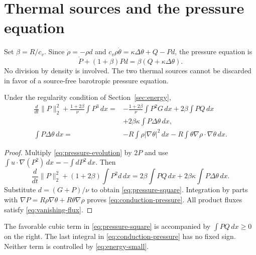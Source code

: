 \documentclass[10pt,twoside]{article}
\newcommand{\dd}{\,dx}
\newcommand{\norm}[2]{\lVert#1\rVert_{#2}}
\begin{document}
\section{Thermal sources and the pressure equation}\label{sec:thermal}
Set $\beta=R/c_v$. Since $\dot\rho=-\rho d$ and
$c_v\rho\dot\theta=\kappa\Delta\theta+Q-Pd$, the pressure equation is
\begin{equation}\label{eq:pressure-evolution}
 \dot P+(1+\beta)Pd=\beta(Q+\kappa\Delta\theta).
\end{equation}
No division by density is involved. The two thermal sources cannot be
discarded in favor of a source-free barotropic pressure equation.

\begin{proposition}\label{prop:pressure-square}
Under the regularity condition of Section~\ref{sec:energy},
\begin{align}
 \frac d{dt}\norm{P}{2}^2+\frac{1+2\beta}{\nu}\int P^3\dd
 ={}&-\frac{1+2\beta}{\nu}\int P^2G\dd+2\beta\int PQ\dd\nonumber\\
 &+2\beta\kappa\int P\Delta\theta\dd,\label{eq:pressure-square}\\
 \int P\Delta\theta\dd
 ={}&-R\int\rho|\nabla\theta|^2\dd
       -R\int\theta\nabla\rho\cdot\nabla\theta\dd.
       \label{eq:conduction-pressure}
\end{align}
\end{proposition}
\begin{proof}
Multiply \eqref{eq:pressure-evolution} by $2P$ and use
$\int u\cdot\nabla(P^2)\dd=-\int dP^2\dd$. Then
\[
 \frac d{dt}\norm{P}{2}^2+(1+2\beta)\int P^2d\dd
       =2\beta\int PQ\dd+2\beta\kappa\int P\Delta\theta\dd.
\]
Substitute $d=(G+P)/\nu$ to obtain \eqref{eq:pressure-square}.
Integration by parts with
$\nabla P=R\rho\nabla\theta+R\theta\nabla\rho$ proves
\eqref{eq:conduction-pressure}. All product fluxes satisfy
\eqref{eq:vanishing-flux}.
\end{proof}

The favorable cubic term in \eqref{eq:pressure-square} is accompanied
by $\int PQ\dd\ge0$ on the right. The last integral in
\eqref{eq:conduction-pressure} has no fixed sign.
Neither term is controlled by \eqref{eq:energy-small}.
\end{document}
